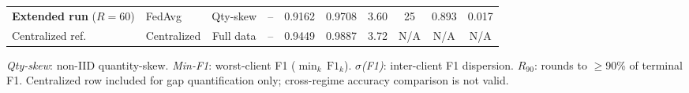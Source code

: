 \documentclass[conference]{IEEEtran}
\begin{document}
\begin{table}[!t]
{\begin{tabular}{llcccccccc}
\textbf{Extended run} ($R{=}60$)
& FedAvg & Qty-skew & -- & 0.9162 & 0.9708 & 3.60 & 25 & 0.893 & 0.017 \\
Centralized ref.\
& Centralized & Full data & -- & 0.9449 & 0.9887 & 3.72
& N/A & N/A & N/A \\
\bottomrule
\end{tabular}}
\vspace{1mm}
\begin{minipage}{\linewidth}
\footnotesize{\textit{Qty-skew}: non-IID quantity-skew.
\textit{Min-F1}: worst-client F1 ($\min_k\,\mathrm{F1}_k$).
\textit{$\sigma$(F1)}: inter-client F1 dispersion.
\textit{$R_{90}$}: rounds to $\geq$90\% of terminal F1.
Centralized row included for gap quantification only;
cross-regime accuracy comparison is not valid.}
\end{minipage}
\end{table}
\end{document}
